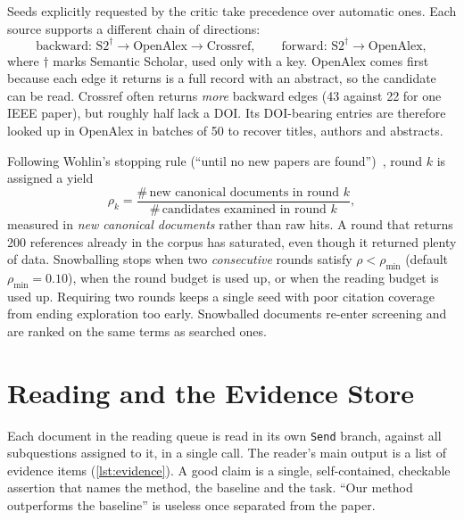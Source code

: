 \documentclass[10pt,a4paper]{article}
\newcommand{\hfont}{\sffamily}
\renewcommand{\paragraph}[1]{%
  \par\vspace{0.35em}{\hfont\bfseries\color{accent}#1}\hspace{0.6em}\ignorespaces}
\newcommand{\code}[1]{\texttt{#1}}
\begin{document}
Seeds explicitly requested by the critic take precedence over automatic
ones. Each source supports a different chain of directions:
\[
\text{backward: } \text{S2}^{\dagger} \to \text{OpenAlex} \to \text{Crossref},
\qquad
\text{forward: } \text{S2}^{\dagger} \to \text{OpenAlex},
\]
where $\dagger$ marks Semantic Scholar, used only with a key. OpenAlex
comes first because each edge it returns is a full record with an
abstract, so the candidate can be read. Crossref often returns
\emph{more} backward edges (43 against 22 for one IEEE paper), but roughly
half lack a DOI. Its DOI-bearing entries are therefore looked up in
OpenAlex in batches of 50 to recover titles, authors and abstracts.

\paragraph{Saturation.} Following Wohlin's stopping rule (``until no new
papers are found'')~\citep{wohlin2014guidelines}, round $k$ is assigned a
yield
\begin{equation}
\rho_k = \frac{\#\,\text{new canonical documents in round } k}
              {\#\,\text{candidates examined in round } k},
\end{equation}
measured in \emph{new canonical documents} rather than raw hits. A round
that returns 200 references already in the corpus has saturated, even
though it returned plenty of data. Snowballing stops when two
\emph{consecutive} rounds satisfy $\rho < \rho_{\min}$ (default
$\rho_{\min}=0.10$), when the round budget is used up, or when the reading
budget is used up. Requiring two rounds keeps a single seed with poor
citation coverage from ending exploration too early. Snowballed documents
re-enter screening and are ranked on the same terms as searched ones.

\section{Reading and the Evidence Store}
\label{sec:evidence}

Each document in the reading queue is read in its own \code{Send} branch,
against all subquestions assigned to it, in a single call. The reader's
main output is a list of evidence items (\cref{lst:evidence}). A good claim
is a single, self-contained, checkable assertion that names the method, the
baseline and the task. ``Our method outperforms the baseline'' is useless
once separated from the paper.
\end{document}
